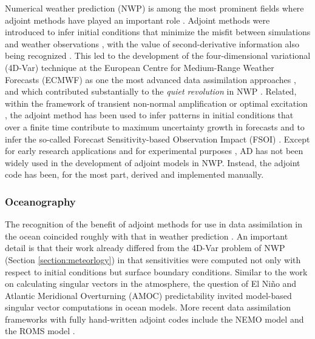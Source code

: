 Numerical weather prediction (NWP) is among the most prominent fields where adjoint methods have played an important role \cite{errico1997adjoint}. 
Adjoint methods were introduced to infer initial conditions that minimize the misfit between simulations and weather observations \cite{Lewis.1985,Talagrand.1987,Courtier.1987}, with the value of second-derivative information also being recognized \cite{Dimet.2002}. 
This led to the development of the four-dimensional variational (4D-Var) technique at the European Centre for Medium-Range Weather Forecasts (ECMWF) as one the most advanced data assimilation approaches \cite{Rabier.1992,Rabier:2000uu}, and which contributed substantially to the \textit{quiet revolution} in NWP \cite{Bauer.2015}.
Related, within the framework of transient non-normal amplification or optimal excitation \cite{Farrell.1988,Farrell:1996jx}, the adjoint method has been used to infer patterns in initial conditions that over a finite time contribute to maximum uncertainty growth in forecasts \cite{Palmer:1994br,Buizza:1995in} and to infer the so-called Forecast Sensitivity-based Observation Impact (FSOI) \cite{Langland:2004jo}.
Except for early research applications \cite{Park.1996,Park.2000} and for experimental purposes \cite{Giering.2006}, AD has not been widely used in the development of adjoint models in NWP.
Instead, the adjoint code has been, for the most part, derived and implemented manually.

\subsubsection{Oceanography}

The recognition of the benefit of adjoint methods for use in data assimilation in the ocean coincided roughly with that in weather prediction \cite{Thacker:1988kp,Thacker:1988ed,Thacker:1989jf,Tziperman.1989,Tziperman:1992hg,Tziperman:1992jw}. 
An important detail is that their work already differed from the 4D-Var problem of NWP (Section \ref{section:meteorlogy}) in that sensitivities were computed not only with respect to initial conditions but surface boundary conditions.
Similar to the work on calculating singular vectors in the atmosphere, 
the question of El Ni\~no \cite{Moore.1997ah,Moore.1997}
and Atlantic Meridional Overturning (AMOC) \cite{Zanna.2010,Zanna:2011ge,Zanna:2012dw}
predictability invited model-based singular vector computations in ocean models. 
More recent data assimilation frameworks with fully hand-written adjoint codes include the NEMO model \cite{Weaver.2003,Vidard:2015kj} and the ROMS model \cite{Moore:2004fk,Moore:2011bc}.

